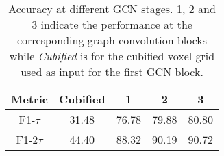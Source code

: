 \begin{table}[ht]
\begin{center}
\begin{tabular}{c | c c c c}
    \hline
    Metric & Cubified & 1 & 2 & 3 \\
    \hline
    F1-$\tau$   & 31.48 & 76.78 & 79.88 & 80.80 \\
    F1-$2\tau$  & 44.40 & 88.32 & 90.19 & 90.72 \\
    \hline
\end{tabular}
\end{center}
\caption{
    Accuracy at different GCN stages. 1, 2 and 3 indicate the performance at the corresponding graph convolution blocks while \emph{Cubified} is for the cubified voxel grid used as input for the first GCN block.
}
\label{table:gcn_stages}
\end{table}

